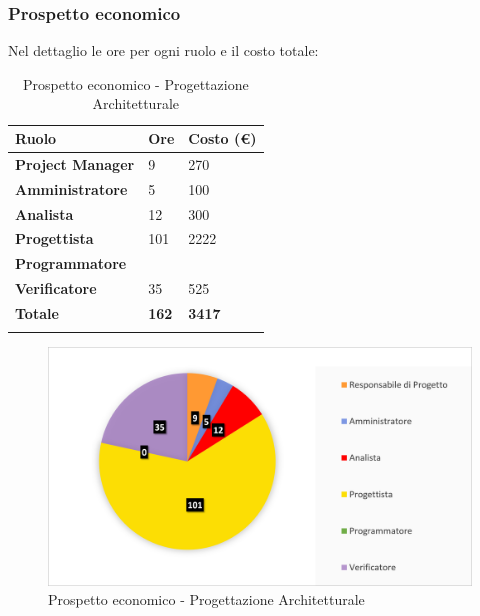 \subsubsection{Prospetto economico}
Nel dettaglio le ore per ogni ruolo e il costo totale: 
\begin{center}
	\def\arraystretch{1.6}
	\bgroup
	\begin{longtable}{| p{4cm} | p{1cm} | p{2cm} |}
		\hline
		\textbf{Ruolo} & \textbf{Ore} & \textbf{Costo (€)} \\ 
		
		\hline \hline  
		
		\textbf{Project Manager} & {9} & {270} \\ 
		\hline 
		
		\textbf{Amministratore} & {5} & {100} \\ 
		\hline 
		
		\textbf{Analista} & {12} & {300} \\ 
		\hline 
		
		\textbf{Progettista} & {101} & {2222} \\ 
		\hline 
		
		\textbf{Programmatore} & {} & {} \\ 
		\hline 
		
		\textbf{Verificatore} & {35} & {525} \\ 
		\hline 
		
		\textbf{Totale} & \textbf{162} & \textbf{3417} \\ 
		\hline 
		
		
		\hline 
		
		\caption{Prospetto economico - Progettazione Architetturale}
	\end{longtable}
	\egroup
\end{center}
\begin{figure}[H]
	\centering
	\includegraphics[width= 14cm]{immagini/pa_torta.png}
	\caption{Prospetto economico - Progettazione Architetturale}
\end{figure}
\newpage

